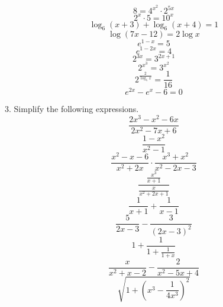 \documentclass[11pt]{article}
\begin{document}
  \begin{equation}
    \label{eq:phahmobu}
    8=4^{x^{2}}\cdot{}2^{5x}
  \end{equation}
  \begin{equation}
    \label{eq:xonguoge}
    2^{x}\cdot{}5=10^{x}
  \end{equation}
  \begin{equation}
    \label{eq:aeshaite}
    \log_{6}(x+3)+\log_{6}(x+4)=1
  \end{equation}
  \begin{equation}
    \label{eq:eequabae}
    \log(7x-12)=2\log{}x
  \end{equation}
  \begin{equation}
    \label{eq:niephait}
    e^{1-x}=5
  \end{equation}
  \begin{equation}
    \label{eq:eophooki}
    e^{1-2x}=4
  \end{equation}
  \begin{equation}
    \label{eq:eevaicei}
    2^{3x}=3^{2x+1}
  \end{equation}
  \begin{equation}
    \label{eq:ohquaiva}
    2^{x^{3}}=3^{x^{2}}
  \end{equation}
  \begin{equation}
    \label{eq:poikeeng}
    2^{\frac{2}{\log_{5}x}}=\frac{1}{16}
  \end{equation}
\begin{equation}
  \label{eq:haesiiro}
  e^{2x}-e^{x}-6=0
\end{equation}

3. Simplify the following expressions.
\begin{equation}
  \label{eq:ceedarai}
\frac{2x^{3}-x^{2}-6x}{2x^{2}-7x+6}
\end{equation}
\begin{equation}
  \label{eq:ohchahph}
\frac{1-x^{2}}{x^{2}-1}
\end{equation}
\begin{equation}
  \label{eq:eiwaegeb}
\frac{x^{2}-x-6}{x^{2}+2x}\cdot\frac{x^{3}+x^{2}}{x^{2}-2x-3}
\end{equation}
\begin{equation}
  \label{eq:eithuogh}
\frac{\frac{x^{3}}{x+1}}{\frac{x}{x^{2}+2x+1}}
\end{equation}
\begin{equation}
  \label{eq:aehohthu}
\frac{1}{x+1}+\frac{1}{x-1}
\end{equation}
\begin{equation}
  \label{eq:iewugeth}
\frac{5}{2x-3}-\frac{3}{(2x-3)^{2}}
\end{equation}
\begin{equation}
  \label{eq:tiphaike}
1+\frac{1}{1+\frac{1}{1+x}}
\end{equation}
\begin{equation}
  \label{eq:guoquoht}
\frac{x}{x^{2}+x-2}-\frac{2}{x^{2}-5x+4}
\end{equation}
\begin{equation}
  \label{eq:moogahve}
\sqrt{1+\left(x^{3}-\frac{1}{4x^{3}}\right)^{2}}
\end{equation}
\end{document}
